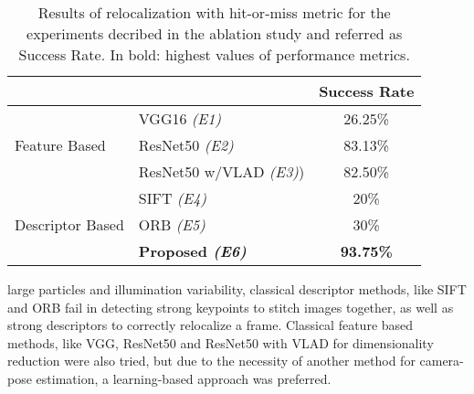\documentclass[sn-basic]{sn-jnl}%
\begin{document}
\begin{table}
\centering
\caption[Results of Recovery with hit-or-miss metric for the experiments decribed in the ablation study]{Results of relocalization with hit-or-miss metric for the experiments decribed in the ablation study and referred as Success Rate. In bold: highest values of performance metrics.}
\label{tab:results_relocalize_hm}
\begin{tabular}{llc}
                                       &                                             & \multicolumn{1}{l}{\textbf{Success Rate}} \\ \hline
\multicolumn{1}{|l|}{}                 & \multicolumn{1}{l|}{VGG16 \textit{(E1)}}               & \multicolumn{1}{c|}{26.25\%}                     \\ \cline{2-3} 
\multicolumn{1}{|l|}{Feature Based}    & \multicolumn{1}{l|}{ResNet50 \textit{(E2)}}            & \multicolumn{1}{c|}{83.13\%}                    \\ \cline{2-3} 
\multicolumn{1}{|l|}{}                 & \multicolumn{1}{l|}{ResNet50 w/VLAD \textit{(E3)})}     & \multicolumn{1}{c|}{82.50\%}                    \\ \hline
\multicolumn{1}{|l|}{}                 & \multicolumn{1}{l|}{SIFT \textit{(E4)}}              & \multicolumn{1}{c|}{20\%}                    \\ \cline{2-3} 
\multicolumn{1}{|l|}{Descriptor Based} & \multicolumn{1}{l|}{ORB \textit{(E5)}}               & \multicolumn{1}{c|}{30\%}                    \\ \cline{2-3} 
\multicolumn{1}{|l|}{}                 & \multicolumn{1}{l|}{\textbf{Proposed \textit{(E6)}}} & \multicolumn{1}{c|}{\textbf{93.75\%}}           \\ \hline
\end{tabular}
\end{table} large particles and illumination variability, classical descriptor methods, like SIFT and ORB fail in detecting strong keypoints to stitch images together, as well as strong descriptors to correctly relocalize a frame. Classical feature based methods, like VGG, ResNet50 and ResNet50 with VLAD for dimensionality reduction were also tried, but due to the necessity of another method for camera-pose estimation, a learning-based approach was preferred. 

\end{document}
